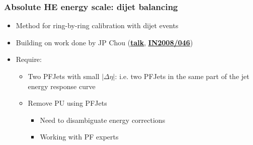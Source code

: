 \documentclass[bigger]{beamer}
\providecommand{\alert}[1]{\textbf{#1}}
\begin{document}
\begin{frame}
\frametitle{Absolute HE energy scale: dijet balancing}
\label{sec-2-4-2}
\begin{itemize}

\item Method for ring-by-ring calibration with dijet events
\label{sec-2-4-2-1}%

\item Building on work done by JP Chou (\href{https://indico.cern.ch/event/75820/session/0/contribution/9/material/slides/0.pdf}{\underline{\alert{talk}}}, \href{http://cms.cern.ch/iCMS/jsp/openfile.jsp?type=IN&year=2008&files=IN2008_046.pdf}{\underline{\alert{IN2008/046}}})
\label{sec-2-4-2-2}%

\item Require:
\label{sec-2-4-2-3}%
\begin{itemize}

\item Two PFJets with small $|\Delta \eta|$: i.e. two PFJets in the same part of the jet energy response curve
\label{sec-2-4-2-3-1}%

\item Remove PU using PFJets
\label{sec-2-4-2-3-2}%
\begin{itemize}

\item Need to disambiguate energy corrections
\label{sec-2-4-2-3-2-1}%

\item Working with PF experts
\label{sec-2-4-2-3-2-2}%
\end{itemize} %
\end{itemize} %
\end{itemize} %
\end{frame}
\end{document}
